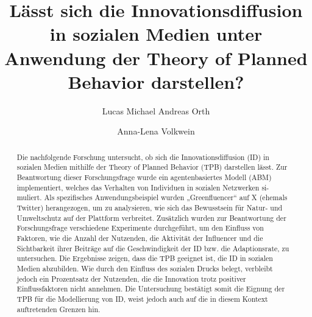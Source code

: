 \documentclass[runningheads]{llncs}
\begin{document}
%
\title{Lässt sich die Innovationsdiffusion in sozialen Medien unter Anwendung der Theory of Planned Behavior darstellen?}
%
%
\author{Lucas Michael Andreas Orth \and
Anna-Lena Volkwein}
%
%
%
\maketitle       %
%
\begin{abstract}

Die nachfolgende Forschung untersucht, ob sich die Innovationsdiffusion (ID) in sozialen Medien mithilfe der Theory of Planned Behavior (TPB) darstellen lässt. Zur Beantwortung dieser Forschungsfrage wurde ein agentenbasiertes Modell (ABM) implementiert, welches das Verhalten von Individuen in sozialen Netzwerken si- muliert. Als spezifisches Anwendungsbeispiel wurden „Greenfluencer“ auf X (ehemals Twitter) herangezogen, um zu analysieren, wie sich das Bewusstsein für Natur- und Umweltschutz auf der Plattform verbreitet. Zusätzlich wurden zur Beantwortung der Forschungsfrage verschiedene Experimente durchgeführt, um den Einfluss von Faktoren, wie die Anzahl der Nutzenden, die Aktivität der Influencer und die Sichtbarkeit ihrer Beiträge auf die Geschwindigkeit der ID bzw. die Adaptionsrate, zu untersuchen. Die Ergebnisse zeigen, dass die TPB geeignet ist, die ID in sozialen Medien abzubilden. Wie durch den Einfluss des sozialen Drucks belegt, verbleibt jedoch ein Prozentsatz der Nutzenden, die die Innovation trotz positiver Einflussfaktoren nicht annehmen. Die Untersuchung bestätigt somit die Eignung der TPB für die Modellierung von ID, weist jedoch auch auf die in diesem Kontext auftretenden Grenzen hin.


\end{abstract}
%
%
\end{document}
